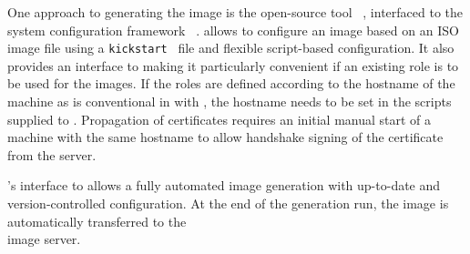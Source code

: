 
One approach to generating the image is the open-source tool
\Packer~\cite{packer}, interfaced to the system configuration framework \Puppet~\cite{puppet}.
\Packer allows to configure an image based on an ISO image file using a \texttt{kickstart}~\cite{kickstart} file and flexible script-based configuration. 
It also provides an interface to \Puppet making it particularly convenient if an existing \Puppet role is to be used for the images. If the roles are defined according to the hostname of the machine as is conventional in \Puppet with \Hieradata, the hostname needs to be set in the scripts supplied to \Packer. Propagation of certificates requires an initial manual start of a machine with the same hostname to allow handshake signing of the certificate from the \Puppet server.

\Packer's interface to \Puppet allows a fully automated image generation with up-to-date and version-controlled configuration. At the end of the generation run, the image is automatically transferred to the \\\Openstack image server.





